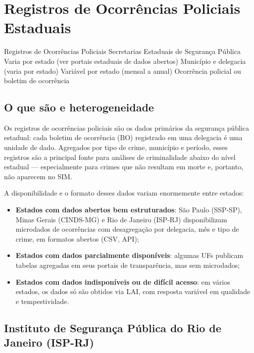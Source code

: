\section{Registros de Ocorrências Policiais Estaduais}

\ficharapida
  {Registros de Ocorrências Policiais}
  {Secretarias Estaduais de Segurança Pública}
  {Varia por estado (ver portais estaduais de dados abertos)}
  {Município e delegacia (varia por estado)}
  {Variável por estado (mensal a anual)}
  {Ocorrência policial ou boletim de ocorrência}

\subsection{O que são e heterogeneidade}

Os registros de ocorrências policiais são os dados primários da segurança pública estadual: cada boletim de ocorrência (BO) registrado em uma delegacia é uma unidade de dado. Agregados por tipo de crime, município e período, esses registros são a principal fonte para análises de criminalidade abaixo do nível estadual --- especialmente para crimes que não resultam em morte e, portanto, não aparecem no SIM.

A disponibilidade e o formato desses dados variam enormemente entre estados:

\begin{itemize}
  \item \textbf{Estados com dados abertos bem estruturados}: São Paulo (SSP-SP), Minas Gerais (CINDS-MG) e Rio de Janeiro (ISP-RJ) disponibilizam microdados de ocorrências com desagregação por delegacia, mês e tipo de crime, em formatos abertos (CSV, API);
  \item \textbf{Estados com dados parcialmente disponíveis}: algumas UFs publicam tabelas agregadas em seus portais de transparência, mas sem microdados;
  \item \textbf{Estados com dados indisponíveis ou de difícil acesso}: em vários estados, os dados só são obtidos via LAI, com resposta variável em qualidade e tempestividade.
\end{itemize}

\subsection{Instituto de Segurança Pública do Rio de Janeiro (ISP-RJ)}

